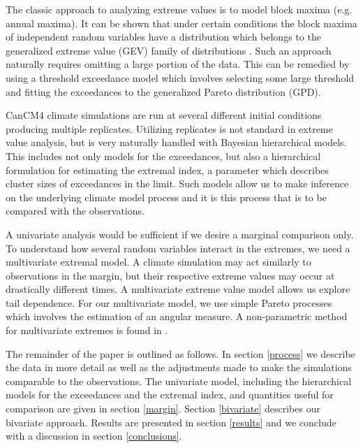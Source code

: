 The classic approach to analyzing extreme values is to model block maxima (e.g. annual maxima). It can be shown that under certain conditions the block maxima of independent random variables have a distribution which belongs to the generalized extreme value (GEV) family of distributions \citep{coles2001introduction}. Such an approach naturally requires omitting a large portion of the data. This can be remedied by using a threshold exceedance model which involves selecting some large threshold and fitting the exceedances to the generalized Pareto distribution (GPD).


CanCM4 climate simulations are run at several different initial conditions producing multiple replicates. Utilizing replicates is not standard in extreme value analysis, but is very naturally handled with Bayesian hierarchical models. This includes not only models for the exceedances, but also a hierarchical formulation for estimating the extremal index, a parameter which describes cluster sizes of exceedances in the limit. Such models allow us to make inference on the underlying climate model process and it is this process that is to be compared with the observations.

A univariate analysis would be sufficient if we desire a marginal comparison only. To understand how several random variables interact in the extremes, we need a multivariate extremal model. A climate simulation may act similarly to observations in the margin, but their respective extreme values may occur at drastically different times. A multivariate extreme value model allows us explore tail dependence. For our multivariate model, we use simple Pareto processes \citep{ferreira2014generalized} which involves the estimation of an angular measure. A non-parametric method for multivariate extremes is found in \cite{goix2015sparsity}.



The remainder of the paper is outlined as follows. In section \ref{process} we describe the data in more detail as well as the adjustments made to make the simulations comparable to the observations. The univariate model, including the hierarchical models for the exceedances and the extremal index, and quantities useful for comparison are given in section \ref{margin}. Section \ref{bivariate} describes our bivariate approach. Results are presented in section \ref{results} and we conclude with a discussion in section \ref{conclusions}.





